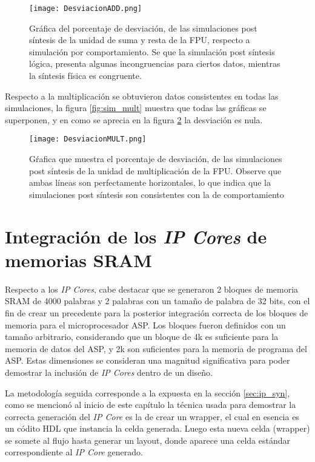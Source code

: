 \begin{figure}[h]
\texttt{[image: DesviacionADD.png]}
\centering
\caption{Gráfica del porcentaje de desviación, de las simulaciones post síntesis de la unidad de suma y resta de la FPU, respecto a simulación por comportamiento. Se que la simulación post síntesis lógica, presenta algunas incongruencias para ciertos datos, mientras la síntesis física es congruente.}
\label{fig:desv_add}
\end{figure}

Respecto a la multiplicación se obtuvieron datos consistentes en todas las simulaciones, la figura \ref{fig:sim_mult} muestra que todas las gráficas se superponen, y en como se aprecia en la figura \ref{fig:desv_mult} la desviación es nula.

\begin{figure}[h]
\texttt{[image: DesviacionMULT.png]}
\centering
\caption{Gŕafica que muestra el porcentaje de desviación, de las simulaciones post síntesis de la unidad de multiplicación de la FPU. Observe que ambas líneas son perfectamente horizontales, lo que indica que la simulaciones post síntesis son consistentes con la de comportamiento}
\label{fig:desv_mult}
\end{figure}

\newpage

\section{Integración de los \textit{IP Cores} de memorias SRAM}

Respecto a los \textit{IP Cores}, cabe destacar que se generaron 2 bloques de memoria SRAM de 4000 palabras y 2 palabras con un tamaño de palabra de 32 bits, con el fin de crear un precedente para la posterior integración correcta de los bloques de memoria para el microprocesador ASP. Los bloques fueron definidos con un tamaño arbitrario, considerando que un bloque de 4k es suficiente para la memoria de datos del ASP, y 2k son suficientes para la memoria de programa del ASP. Estas dimensiones se consideran una magnitud significativa para poder demostrar la inclusión de \textit{IP Cores} dentro de un diseño.

La metodología seguida corresponde a la expuesta en la sección \ref{sec:ip_syn}, como se mencionó al inicio de este capítulo la técnica usada para demostrar la correcta generación del \textit{IP Core} es la de crear un wrapper, el cual en esencia es un códito HDL que instancia la celda generada. Luego esta nueva celda (wrapper) se somete al flujo hasta generar un layout, donde aparece una celda estándar correspondiente al \textit{IP Core} generado.

